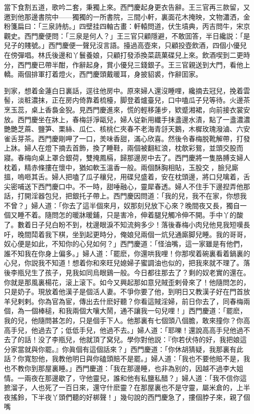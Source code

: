 當下食割五道，歌吟二套，秉獨上來。西門慶起身更衣告辭。王三官再三款留，又邀到他那邊書院中——獨獨的一所書院，三間小軒，裏面花木掩映，文物瀟洒，金粉箋扁曰：「三泉詩舫。」四壁挂四軸古畫：軒轅問道，伏生墳典，丙吉問牛，宋京觀史。西門慶便問：「三泉是何人？」王三官只顧隱避，不敢囬答，半日纔説：「是兒子的賤號。」西門慶便一聲兒沒言語。擡過高壺來，只顧投壺飲酒，四個小優兒在傍彈唱。林氏後邊和丫鬟養娘，只顧打發添換菜蔬菓碟兒上來。飲酒喫到二更時分，西門慶已帶半酣，作辭起身，賞小優兒三錢銀子。王三官親送到大門，看他上轎。兩個排軍打着燈火，西門慶頭戴暖耳，身披貂裘，作辭囬家。

到家，想着金蓮白日裏話，逕往他房中。原來婦人還沒睡哩，纔摘去冠兒，挽着雲髻，淡粧濃抹，正在房内倚靠着梳檯，脚登着爐臺兒，口中嗑瓜子兒等待。火邊茶烹玉蕊，桌上香裊金猊。見西門慶進來，慌的輕移蓮步，欵蹙湘裙，向前接衣裳安放。西門慶坐在牀上，春梅㧱淨甌兒，婦人従新用纖手抹盞邊水漬，點了一盞濃濃艷艷芝蔴、鹽笋、栗絲、瓜仁、核桃仁夾春不老海青㧱天鵝，木樨玫瑰潑滷、六安雀舌芽茶。西門慶剛呷了一口，羙味香甜，滿心欣喜。然後令春梅脱靴解帶，打發上牀。婦人在燈下摘去首飾，換了睡鞋，兩個被翻紅浪，枕欹彩鴛，並頭交股而寢。春梅向桌上罩合銀荷，雙掩鳳槅，歸那邊房中去了。西門慶將一隻胳膊支婦人枕着，精赤條摟在懷中，猶如軟玉溫香一般。兩個酥胸相貼，玉股交𣐝，臉兒廝搵，嗚咂其舌。婦人把嗑了瓜子穰兒，用碟兒盛着，安在枕頭邊，將口兒噙着，舌尖密哺送下西門慶口中。不一時，甜唾融心，靈犀春透。婦人不住手下邊揑弄他那話，打開淫器包兒，把銀托子帶上。西門慶因問道：「我的兒，我不在家，你想我不曾？」婦人道：「你去了這半個來月，奴那刻兒放下心來？晚間夜又長，獨自一個又睡不着。隨問怎的暖牀暖鋪，只是害冷，伸着腿兒觸冷伸不開。手中丫的酸了。數着日子兒白盼不到，枕邊眼淚不知流夠多少！落後春梅小肉兒他見我短嘆長吁，晚間鬦着我下棋，坐到起更時分，俺娘兒兩個一炕兒通廝脚兒睡。我的哥哥，奴心便是如此，不知你的心兒如何？」西門慶道：「怪油嘴，這一家雖是有他們，誰不知我在你身上偏多。」婦人道：「罷麽，你還哄我哩！你那喫着碗裏看着鍋裏的心兒，你説我不知道！想着你和來旺兒媳婦子蜜調油也似的，把我來就不理了。落後李瓶兒生了孩子，見我如同烏眼鷄一般。今日都往那去了？剩的奴老實的還在。你就是那風裏楊花，滚上滚下。如今又興起那如意兒賊歪剌骨來了！他隨問怎的，只是奶子。現放着他漢子是個活人妻。不爭你要了他，到明日又教漢子好在門首放羊兒剌剌。你為官為宦，傳出去什麽好聽？你看這賊淫婦，前日你去了，同春梅兩個，為一個棒槌，和我兩個大嚷大鬧，通不讓我一句兒哩！」西門慶道：「罷麽，我的兒，他隨問甚怎的，只是個手下人。他那裏有七個頭八個膽，敢來撞你？你高高手兒，他過去了；低低手兒，他過不去。」婦人道：「耶嚛！還說高高手兒他過不去了的話！没了李瓶兒，他就頂了窝兒。學你對他説：『你若伏侍的好，我把娘這分家當就與你罷。』你眞個有這個話來？」西門慶道：「你休胡猜疑，我那裏有此話？你寬恕他，我教他明日與你磕頭賠不是罷。」婦人道：「我也不要他賠不是，我也不教你到那屋裏睡。」西門慶道：「我在那邊睡，也非為别的，因越不過李大姐情。一兩夜在那邊歇了，守他靈兒，誰和他有私鹽私醋？」婦人道：「我不信你這摭溜子，人也死了一百日來，還守什麽靈？在那屋裏也不是守靈，屬米倉的，上半夜搖鈴，下半夜丫頭們聽的好梆聲！」幾句說的西門慶急了，摟個脖子來，親了個嘴